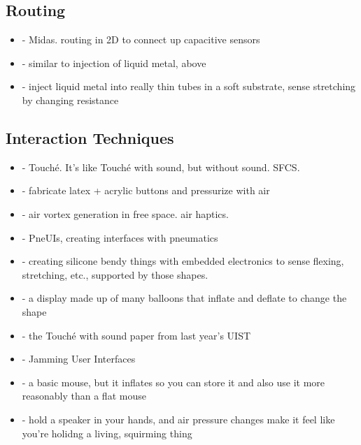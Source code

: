 \subsection{Routing}
\begin{itemize}
\item \cite{Savage-midas} - Midas.  routing in 2D to connect up capacitive sensors
\item \cite{Park-microchannels} - similar to injection of liquid metal, above
\item \cite{Majidi-curvature} - inject liquid metal into really thin tubes in a soft substrate, sense stretching by changing resistance
\end{itemize}

\subsection{Interaction Techniques}
\begin{itemize}
\item \cite{Sato-touche} - Touch\'{e}.  It's like Touch\'{e} with sound, but without sound.  SFCS.
\item \cite{Harrison-buttons} - fabricate latex + acrylic buttons and pressurize with air
\item \cite{Sodhi-aireal} - air vortex generation in free space.  air haptics.
\item \cite{Yao-pneui} - PneUIs, creating interfaces with pneumatics
\item \cite{Slyper-shape} - creating silicone bendy things with embedded electronics to sense flexing, stretching, etc., supported by those shapes.
\item \cite{Iwata-volflex} - a display made up of many balloons that inflate and deflate to change the shape
\item \cite{Ono-touchandactivate} - the Touch\'{e} with sound paper from last year's UIST
\item \cite{Follmer-jamming} - Jamming User Interfaces
\item \cite{Kim-inflatablemouse} - a basic mouse, but it inflates so you can store it and also use it more reasonably than a flat mouse
\item \cite{Hashimoto-squirming} - hold a speaker in your hands, and air pressure changes make it feel like you're holidng a living, squirming thing
\end{itemize}


